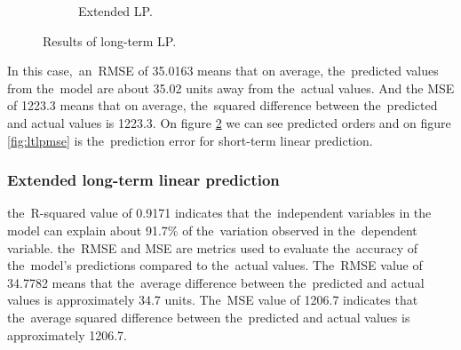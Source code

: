 \begin{figure}[h!]
\begin{subfigure}[b]{0.6\textwidth}
            \caption{Extended LP.}
            \label{fig:eltlp}
        \end{subfigure}
        \caption{Results of long-term LP.}
        \label{fig:longresult}
    \end{figure}
    In this case,~an~RMSE of 35.0163 means that on average, the~predicted values from
    the~model are about 35.02 units away from the~actual values. And the
    MSE of 1223.3 means that on average, the~squared difference between the~predicted
    and actual values is 1223.3. On figure \ref{fig:longresult} we can see predicted
    orders and on figure \ref{fig:ltlpmse} is the~prediction error for short-term
    linear prediction.
    
    \subsubsection{Extended long-term linear prediction} \label{subsec:res_eltlp}
     the~R-squared value of 0.9171 indicates that the~independent variables in the
    model can explain about 91.7\% of the~variation observed in the~dependent variable.
     the~RMSE and MSE are metrics used to evaluate the~accuracy of the~model's predictions
    compared to the~actual values. The~RMSE value of 34.7782 means that the~average difference
    between the~predicted and actual values is approximately 34.7 units. The~MSE value of
    1206.7 indicates that the~average squared difference between the~predicted and actual
    values is approximately 1206.7.
